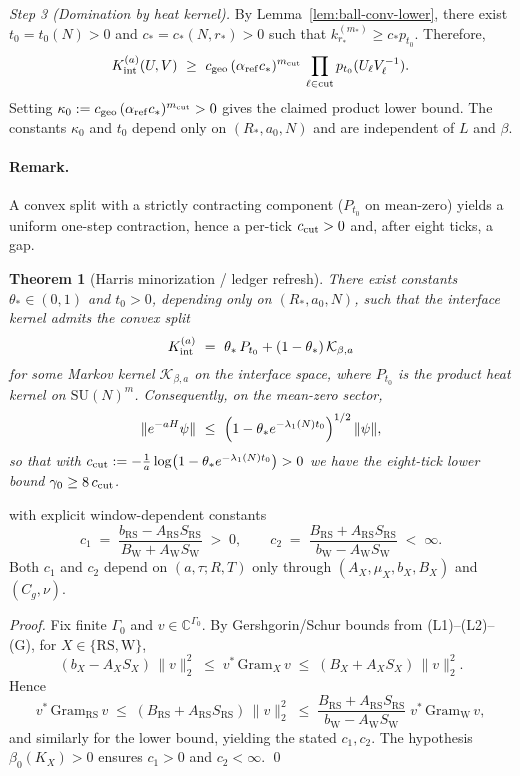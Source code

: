 \documentclass[11pt]{amsart}
\theoremstyle{plain}
\newtheorem{theorem}{Theorem}[section]
\theoremstyle{definition}
\theoremstyle{remark}
\begin{document}
\emph{Step 3 (Domination by heat kernel).} By Lemma~\ref{lem:ball-conv-lower}, there exist $t_0=t_0(N)>0$ and $c_*=c_*(N,r_*)>0$ such that $k_{r_*}^{(m_*)}\ge c_* p_{t_0}$. Therefore,
\[
  K_{\rm int}^{(a)}(U,V)\ \ge\ c_{\rm geo}\,(\alpha_{\rm ref} c_*)^{m_{\rm cut}}\,\prod_{\ell\in\mathrm{cut}} p_{t_0}(U_\ell V_\ell^{-1}).
\]
Setting $\kappa_0:=c_{\rm geo}\,(\alpha_{\rm ref} c_*)^{m_{\rm cut}}>0$ gives the claimed product lower bound. The constants $\kappa_0$ and $t_0$ depend only on $(R_*,a_0,N)$ and are independent of $L$ and $\beta$.

\paragraph{Remark.} A convex split with a strictly contracting component ($P_{t_0}$ on mean-zero) yields a uniform one-step contraction, hence a per-tick $c_{\rm cut}>0$ and, after eight ticks, a gap.
\begin{theorem}[Harris minorization / ledger refresh]\label{thm:harris-refresh}
There exist constants $\theta_*\in(0,1)$ and $t_0>0$, depending only on $(R_*,a_0,N)$, such that the interface kernel admits the convex split
\[
  K_{\rm int}^{(a)}\ =\ \theta_*\,P_{t_0} + (1-\theta_*)\,\mathcal K_{\beta,a}
\]
for some Markov kernel $\mathcal K_{\beta,a}$ on the interface space, where $P_{t_0}$ is the product heat kernel on $\mathrm{SU}(N)^{m}$. Consequently, on the mean-zero sector,
\[
  \|e^{-aH}\psi\|\ \le\ \Bigl(1-\theta_* e^{-\lambda_1(N)t_0}\Bigr)^{1/2}\,\|\psi\|,
\]
so that with \( c_{\rm cut} := -\tfrac{1}{a}\log\bigl(1-\theta_* e^{-\lambda_1(N)t_0}\bigr) > 0 \) we have the eight-tick lower bound \(\gamma_0\ge 8\,c_{\rm cut}\).
\end{theorem}
with explicit window-dependent constants
\[
  c_1\;=\;\frac{b_{\mathrm{RS}}-A_{\mathrm{RS}} S_{\mathrm{RS}}}{B_{\mathrm{W}}+A_{\mathrm{W}} S_{\mathrm{W}}}\;>\;0,\qquad
  c_2\;=\;\frac{B_{\mathrm{RS}}+A_{\mathrm{RS}} S_{\mathrm{RS}}}{b_{\mathrm{W}}-A_{\mathrm{W}} S_{\mathrm{W}}}\;<\;\infty.
\]
Both $c_1$ and $c_2$ depend on $(a,\tau;R,T)$ only through $(A_X,\mu_X,b_X,B_X)$ and $(C_g,\nu)$.

\emph{Proof.}
Fix finite $\Gamma_0$ and $v\in\mathbb{C}^{\Gamma_0}$. By Gershgorin/Schur bounds from (L1)--(L2)--(G), for $X\in\{\mathrm{RS},\mathrm{W}\}$,
\[
  (b_X-A_X S_X)\,\|v\|_2^2\;\le\; v^*\,\mathrm{Gram}_X\,v\;\le\; (B_X+A_X S_X)\,\|v\|_2^2.
\]
Hence
\[
  v^*\,\mathrm{Gram}_{\mathrm{RS}}\,v\;\le\;(B_{\mathrm{RS}}+A_{\mathrm{RS}} S_{\mathrm{RS}})\,\|v\|_2^2\;\le\;\frac{B_{\mathrm{RS}}+A_{\mathrm{RS}} S_{\mathrm{RS}}}{b_{\mathrm{W}}-A_{\mathrm{W}} S_{\mathrm{W}}}\; v^*\,\mathrm{Gram}_{\mathrm{W}}\,v,
\]
and similarly for the lower bound, yielding the stated $c_1,c_2$. The hypothesis $\beta_0(K_X)>0$ ensures $c_1>0$ and $c_2<\infty$. \qed
\end{document}
